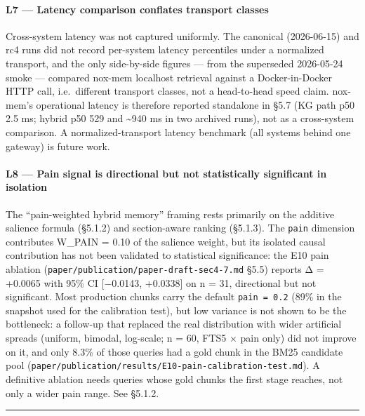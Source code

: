 \documentclass[
]{article}
\begin{document}
\paragraph{L7 --- Latency comparison conflates transport
classes}\label{l7-latency-comparison-conflates-transport-classes}

Cross-system latency was not captured uniformly. The canonical
(2026-06-15) and rc4 runs did not record per-system latency percentiles
under a normalized transport, and the only side-by-side figures --- from
the superseded 2026-05-24 smoke --- compared nox-mem localhost retrieval
against a Docker-in-Docker HTTP call, i.e.~different transport classes,
not a head-to-head speed claim. nox-mem's operational latency is
therefore reported standalone in §5.7 (KG path p50 2.5 ms; hybrid p50
529 and \textasciitilde940 ms in two archived runs), not as a
cross-system comparison. A normalized-transport latency benchmark (all
systems behind one gateway) is future work.

\paragraph{L8 --- Pain signal is directional but not statistically
significant in
isolation}\label{l8-pain-signal-is-directional-but-not-statistically-significant-in-isolation}

The ``pain-weighted hybrid memory'' framing rests primarily on the
additive salience formula (§5.1.2) and section-aware ranking (§5.1.3).
The \texttt{pain} dimension contributes W\_PAIN = 0.10 of the salience
weight, but its isolated causal contribution has not been validated to
statistical significance: the E10 pain ablation
(\texttt{paper/publication/paper-draft-sec4-7.md} §5.5) reports Δ =
+0.0065 with 95\% CI {[}−0.0143, +0.0338{]} on n = 31, directional but
not significant. Most production chunks carry the default
\texttt{pain\ =\ 0.2} (89\% in the snapshot used for the calibration
test), but low variance is not shown to be the bottleneck: a follow-up
that replaced the real distribution with wider artificial spreads
(uniform, bimodal, log-scale; n = 60, FTS5 × pain only) did not improve
on it, and only 8.3\% of those queries had a gold chunk in the BM25
candidate pool
(\texttt{paper/publication/results/E10-pain-calibration-test.md}). A
definitive ablation needs queries whose gold chunks the first stage
reaches, not only a wider pain range. See §5.1.2.

\begin{center}\rule{0.5\linewidth}{0.5pt}\end{center}
\end{document}
